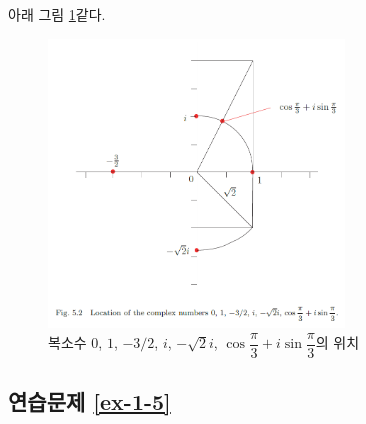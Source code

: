 아래 그림 \ref{fig-5-2}\와 같다.

\begin{figure}[h!]
\begin{center}
\includegraphics[width=0.7\textwidth]{./figs/fig-5-2}
\end{center}
\caption{복소수 $0$, $1$, $-3/2$, $i$, $-\sqrt{2}i$,
$\cos\dfrac\pi3 + i\sin\dfrac\pi3$의 위치}
\label{fig-5-2}
\end{figure}

\subsection*{연습문제 \ref{ex-1-5}}

